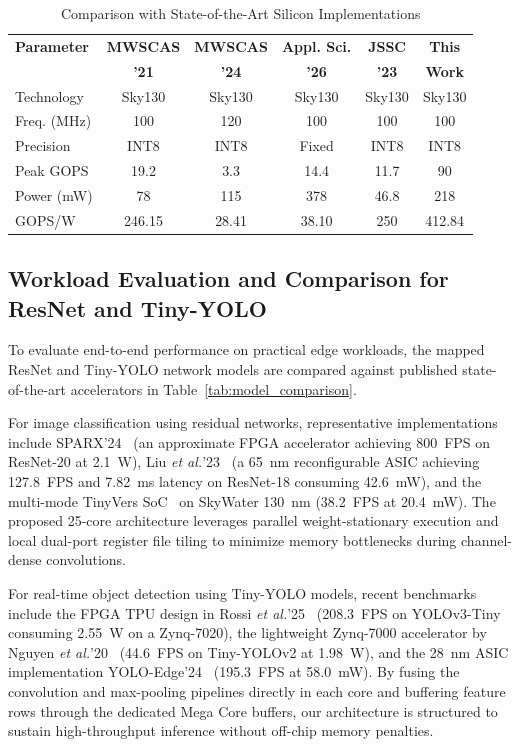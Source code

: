 \documentclass[conference]{IEEEtran}
\begin{document}
\begin{table}[t]
\centering
\caption{Comparison with State-of-the-Art Silicon Implementations}
\label{tab:comparison}
\footnotesize
\setlength{\tabcolsep}{2.2pt}
\begin{tabular}{@{}lccccc@{}}
\hline
\textbf{Parameter} & \textbf{MWSCAS} & \textbf{MWSCAS} & \textbf{Appl. Sci.} & \textbf{JSSC} & \textbf{This} \\
 & \textbf{'21 \cite{Nasser2021}} & \textbf{'24 \cite{Khalil2024}} & \textbf{'26 \cite{Mascorro2026}} & \textbf{'23 \cite{TinyVers}} & \textbf{Work} \\
\hline
Technology        & Sky130 & Sky130 & Sky130 & Sky130 & Sky130 \\
Freq. (MHz)       & 100    & 120    & 100    & 100    & 100   \\
Precision         & INT8   & INT8   & Fixed  & INT8   & INT8  \\
Peak GOPS         & 19.2   & 3.3    & 14.4   & 11.7   & 90    \\
Power (mW)        & 78     & 115    & 378    & 46.8   & 218   \\
GOPS/W            & 246.15 & 28.41  & 38.10  & 250    & 412.84 \\
\hline
\end{tabular}
\end{table}

\subsection{Workload Evaluation and Comparison for ResNet and Tiny-YOLO}
To evaluate end-to-end performance on practical edge workloads, the mapped ResNet and Tiny-YOLO network models are compared against published state-of-the-art accelerators in Table~\ref{tab:model_comparison}.

For image classification using residual networks, representative implementations include SPARX'24~\cite{sparx2024} (an approximate FPGA accelerator achieving 800~FPS on ResNet-20 at 2.1~W), Liu \textit{et al.}'23~\cite{liu2023tvlsi} (a 65~nm reconfigurable ASIC achieving 127.8~FPS and 7.82~ms latency on ResNet-18 consuming 42.6~mW), and the multi-mode TinyVers SoC~\cite{TinyVers} on SkyWater 130~nm (38.2~FPS at 20.4~mW). The proposed 25-core architecture leverages parallel weight-stationary execution and local dual-port register file tiling to minimize memory bottlenecks during channel-dense convolutions.

For real-time object detection using Tiny-YOLO models, recent benchmarks include the FPGA TPU design in Rossi \textit{et al.}'25~\cite{yolov3tiny2025} (208.3~FPS on YOLOv3-Tiny consuming 2.55~W on a Zynq-7020), the lightweight Zynq-7000 accelerator by Nguyen \textit{et al.}'20~\cite{nguyen2020tcas} (44.6~FPS on Tiny-YOLOv2 at 1.98~W), and the 28~nm ASIC implementation YOLO-Edge'24~\cite{yoloedge2024} (195.3~FPS at 58.0~mW). By fusing the convolution and max-pooling pipelines directly in each core and buffering feature rows through the dedicated Mega Core buffers, our architecture is structured to sustain high-throughput inference without off-chip memory penalties.
\end{document}
